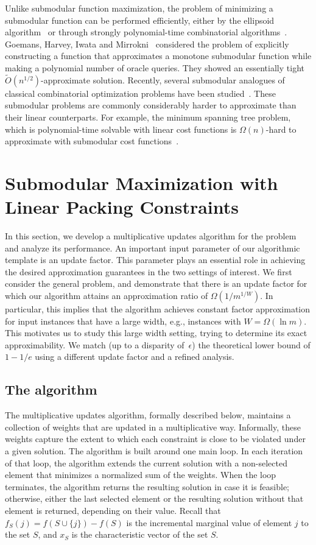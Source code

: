 \documentclass[11pt]{article}
\theoremstyle{plain}
\theoremstyle{definition}
\begin{document}
Unlike submodular function maximization, the problem of minimizing
a submodular function can be performed efficiently, either by the
ellipsoid algorithm~\cite{GrotschelLS81} or through strongly
polynomial-time combinatorial
algorithms~\cite{Schrijver00,IwataFF01,Iwata03,Orlin07,Iwata08,IwataO09}.
Goemans, Harvey, Iwata and Mirrokni~\cite{GoemansHIM09} considered
the problem of explicitly constructing a function that
approximates a monotone submodular function while making a
polynomial number of oracle queries. They showed an essentially
tight $\tilde{O}(n^{1/2})$-approximate solution. Recently, several
submodular analogues of classical combinatorial optimization
problems have been studied~\cite{SvitkinaF08,GoelKTW09,IwataN09}.
These submodular problems are commonly considerably harder to
approximate than their linear counterparts. For example, the
minimum spanning tree problem, which is polynomial-time solvable
with linear cost functions is $\Omega(n)$-hard to approximate with
submodular cost functions~\cite{GoelKTW09}.


\section{Submodular Maximization with Linear Packing Constraints} \label{sec:GeneralPacking}
In this section, we develop a multiplicative updates algorithm for
the problem and analyze its performance. An important input
parameter of our algorithmic template is an update factor. This
parameter plays an essential role in achieving the desired
approximation guarantees in the two settings of interest. We first
consider the general problem, and demonstrate that there is an
update factor for which our algorithm attains an approximation
ratio of $\Omega(1 / m^{1/W})$. In particular, this implies that
the algorithm achieves constant factor approximation for input
instances that have a large width, e.g., instances with $W =
\Omega(\ln m)$. This motivates us to study this large width
setting, trying to determine its exact approximability. We match
(up to a disparity of~$\epsilon$) the theoretical lower bound of
$1 - 1/e$ using a different update factor and a refined analysis.


\subsection{The algorithm} \label{subsec:Algorithm}
The multiplicative updates algorithm, formally described below,
maintains a collection of weights that are updated in a
multiplicative way. Informally, these weights capture the extent
to which each constraint is close to be violated under a given
solution. The algorithm is built around one main loop. In each
iteration of that loop, the algorithm extends the current solution
with a non-selected element that minimizes a normalized sum of the
weights. When the loop terminates, the algorithm returns the
resulting solution in case it is feasible; otherwise, either the
last selected element or the resulting solution without that
element is returned, depending on their value. Recall that $f_S(j)
= f(S \cup \{j\}) - f(S)$ is the incremental marginal value of
element $j$ to the set $S$, and $x_S$ is the characteristic vector
of the set $S$.
\end{document}
